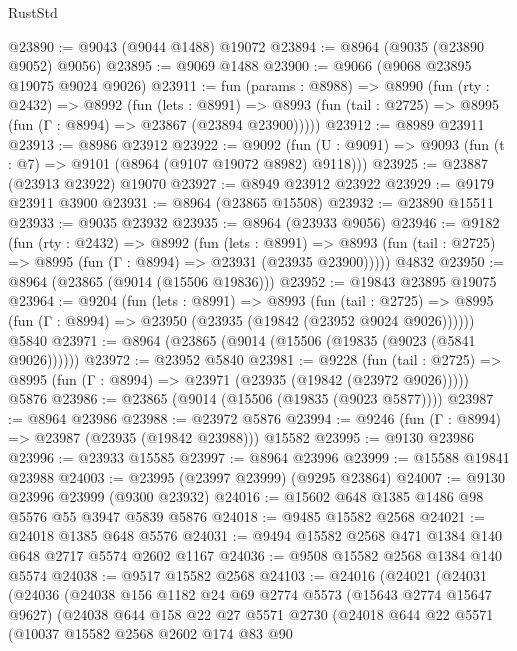 \begin{lexlean}{RustStd}
\begin{coremodule}
@23890 := @9043 (@9044 @1488) @19072
@23894 := @8964 (@9035 (@23890 @9052) @9056)
@23895 := @9069 @1488
@23900 := @9066 (@9068 @23895 @19075 @9024 @9026)
@23911 := fun (params : @8988) =>
  @8990
    (fun (rty : @2432) =>
    @8992
      (fun (lets : @8991) =>
      @8993 (fun (tail : @2725) => @8995 (fun (Γ : @8994) => @23867 (@23894 @23900)))))
@23912 := @8989 @23911
@23913 := @8986 @23912
@23922 := @9092
    (fun (U : @9091) => @9093 (fun (t : @7) => @9101 (@8964 (@9107 @19072 @8982) @9118)))
@23925 := @23887 (@23913 @23922) @19070
@23927 := @8949 @23912 @23922
@23929 := @9179 @23911 @3900
@23931 := @8964 (@23865 @15508)
@23932 := @23890 @15511
@23933 := @9035 @23932
@23935 := @8964 (@23933 @9056)
@23946 := @9182
    (fun (rty : @2432) =>
    @8992
      (fun (lets : @8991) =>
      @8993 (fun (tail : @2725) => @8995 (fun (Γ : @8994) => @23931 (@23935 @23900)))))
    @4832
@23950 := @8964 (@23865 (@9014 (@15506 @19836)))
@23952 := @19843 @23895 @19075
@23964 := @9204
    (fun (lets : @8991) =>
    @8993
      (fun (tail : @2725) =>
      @8995 (fun (Γ : @8994) => @23950 (@23935 (@19842 (@23952 @9024 @9026))))))
    @5840
@23971 := @8964 (@23865 (@9014 (@15506 (@19835 (@9023 (@5841 @9026))))))
@23972 := @23952 @5840
@23981 := @9228
    (fun (tail : @2725) => @8995 (fun (Γ : @8994) => @23971 (@23935 (@19842 (@23972 @9026)))))
    @5876
@23986 := @23865 (@9014 (@15506 (@19835 (@9023 @5877))))
@23987 := @8964 @23986
@23988 := @23972 @5876
@23994 := @9246 (fun (Γ : @8994) => @23987 (@23935 (@19842 @23988))) @15582
@23995 := @9130 @23986
@23996 := @23933 @15585
@23997 := @8964 @23996
@23999 := @15588 @19841 @23988
@24003 := @23995 (@23997 @23999) (@9295 @23864)
@24007 := @9130 @23996 @23999 (@9300 @23932)
@24016 := @15602 @648 @1385 @1486 @98 @5576 @55 @3947 @5839 @5876
@24018 := @9485 @15582 @2568
@24021 := @24018 @1385 @648 @5576
@24031 := @9494 @15582 @2568 @471 @1384 @140 @648 @2717 @5574 @2602 @1167
@24036 := @9508 @15582 @2568 @1384 @140 @5574
@24038 := @9517 @15582 @2568
@24103 := @24016
    (@24021
      (@24031
        (@24036
          (@24038
            @156
            @1182
            @24
            @69
            @2774
            @5573
            (@15643 @2774 @15647 @9627)
            (@24038
              @644
              @158
              @22
              @27
              @5571
              @2730
              (@24018
                @644
                @22
                @5571
                (@10037
                  @15582
                  @2568
                  @2602
                  @174
                  @83
                  @90

\end{coremodule}
\end{lexlean}
